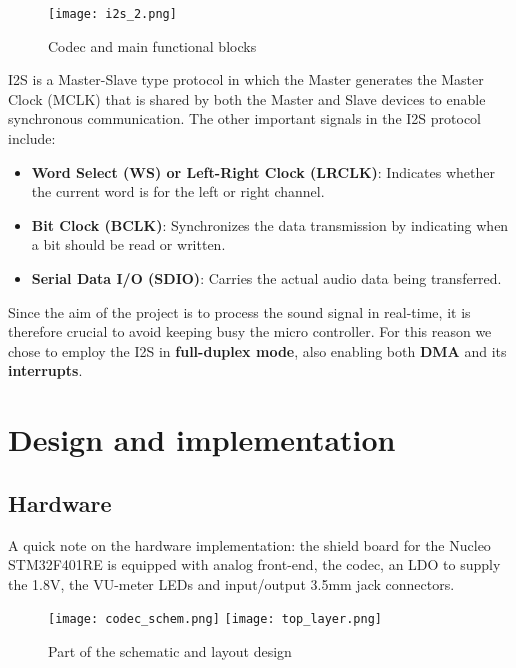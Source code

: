 \documentclass[10pt,a4]{article}
\begin{document}
    \begin{figure}[ht]
        \centering
        \texttt{[image: i2s\_2.png]}
        \caption{Codec and main functional blocks}
    \end{figure}

I2S is a Master-Slave type protocol in which the Master generates the Master Clock (MCLK) that is shared by both the Master and Slave devices to enable synchronous communication. The other important signals in the I2S protocol include:

\begin{itemize}
\item \textbf{Word Select (WS) or Left-Right Clock (LRCLK)}: Indicates whether the current word is for the left or right channel.
\item \textbf{Bit Clock (BCLK)}: Synchronizes the data transmission by indicating when a bit should be read or written.
\item \textbf{Serial Data I/O (SDIO)}: Carries the actual audio data being transferred.
\end{itemize}

Since the aim of the project is to process the sound signal in real-time, it is therefore crucial to avoid keeping busy the micro controller. For this reason we chose to employ the I2S in \textbf{full-duplex mode}, also enabling both \textbf{DMA} and its \textbf{interrupts}.

\pagebreak

\section{Design and implementation}

\subsection{Hardware}
A quick note on the hardware implementation: the shield board for the Nucleo STM32F401RE is equipped with analog front-end, the codec, an LDO to supply the 1.8V, the VU-meter LEDs and input/output 3.5mm jack connectors.

    \begin{figure}[ht]
        \centering
        \texttt{[image: codec\_schem.png]}
        \quad
        \texttt{[image: top\_layer.png]}
        \caption{Part of the schematic and layout design}
    \end{figure}
\end{document}
